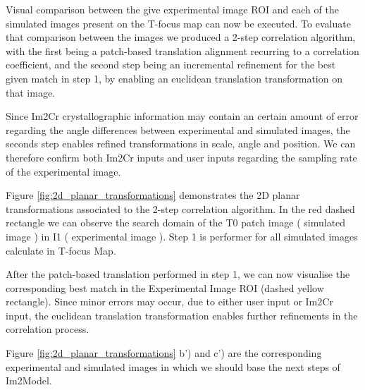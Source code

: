 \documentclass[
  oneside,
  11pt, a4paper,
  footinclude=true,
  headinclude=true,
  cleardoublepage=empty
]{scrbook}
\begin{document}
	Visual comparison between the give experimental image ROI and each of the simulated images present on the T-focus map can now be executed. To evaluate that comparison between the images we produced a 2-step correlation algorithm, with the first being a patch-based translation alignment recurring to a correlation coefficient, and the second step being an incremental refinement for the best given match in step 1, by enabling an euclidean translation transformation on that image.\par 
	Since Im2Cr \citep{asilva2016} crystallographic information may contain an certain amount of error regarding the angle differences between experimental and simulated images, the seconds step enables refined transformations in scale, angle and position. We can therefore confirm both Im2Cr \citep{asilva2016} inputs and user inputs regarding the sampling rate of the experimental image.
	\par 
	Figure \ref{fig:2d_planar_transformations} demonstrates the 2D planar transformations associated to the 2-step correlation algorithm. In the red dashed rectangle we can observe the search domain of the T0 patch image ( simulated image ) in I1 ( experimental image ). Step 1 is performer for all simulated images calculate in T-focus Map. \par 
	After the patch-based translation performed in step 1, we can now visualise the corresponding best match in the Experimental Image ROI (dashed yellow rectangle). Since minor errors may occur, due to either user input or Im2Cr \citep{asilva2016} input, the euclidean translation transformation enables further refinements in the correlation process.\par 
	Figure \ref{fig:2d_planar_transformations} b') and c') are the corresponding experimental and simulated images in which we should base the next steps of Im2Model.
\end{document}
